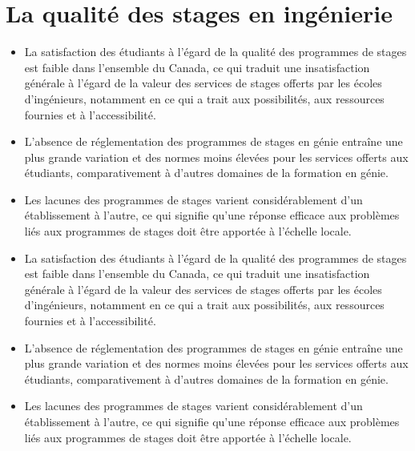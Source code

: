 \section{La qualité des stages en ingénierie}\label{la-qualite-des-stages-en-ingenierie}



\begin{itemize}
 \item La satisfaction des étudiants à l'égard de la qualité des programmes de stages est faible dans l'ensemble du Canada, ce qui traduit une insatisfaction générale à l'égard de la valeur des services de stages offerts par les écoles d'ingénieurs, notamment en ce qui a trait aux possibilités, aux ressources fournies et à l'accessibilité.
 \item L'absence de réglementation des programmes de stages en génie entraîne une plus grande variation et des normes moins élevées pour les services offerts aux étudiants, comparativement à d'autres domaines de la formation en génie.
 \item Les lacunes des programmes de stages varient considérablement d'un établissement à l'autre, ce qui signifie qu'une réponse efficace aux problèmes liés aux programmes de stages doit être apportée à l'échelle locale.
\end{itemize}

\begin{itemize}
 \item La satisfaction des étudiants à l'égard de la qualité des programmes de stages est faible dans l'ensemble du Canada, ce qui traduit une insatisfaction générale à l'égard de la valeur des services de stages offerts par les écoles d'ingénieurs, notamment en ce qui a trait aux possibilités, aux ressources fournies et à l'accessibilité.
 \item L'absence de réglementation des programmes de stages en génie entraîne une plus grande variation et des normes moins élevées pour les services offerts aux étudiants, comparativement à d'autres domaines de la formation en génie.
 \item Les lacunes des programmes de stages varient considérablement d'un établissement à l'autre, ce qui signifie qu'une réponse efficace aux problèmes liés aux programmes de stages doit être apportée à l'échelle locale.
\end{itemize}

